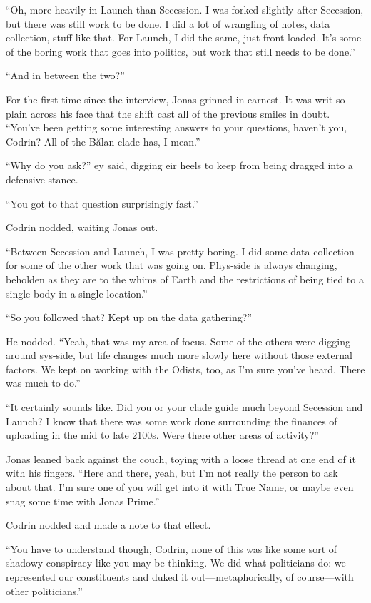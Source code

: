``Oh, more heavily in Launch than Secession. I was forked slightly after Secession, but there was still work to be done. I did a lot of wrangling of notes, data collection, stuff like that. For Launch, I did the same, just front-loaded. It's some of the boring work that goes into politics, but work that still needs to be done.''

``And in between the two?''

For the first time since the interview, Jonas grinned in earnest. It was writ so plain across his face that the shift cast all of the previous smiles in doubt. ``You've been getting some interesting answers to your questions, haven't you, Codrin? All of the Bălan clade has, I mean.''

``Why do you ask?'' ey said, digging eir heels to keep from being dragged into a defensive stance.

``You got to that question surprisingly fast.''

Codrin nodded, waiting Jonas out.

``Between Secession and Launch, I was pretty boring. I did some data collection for some of the other work that was going on. Phys-side is always changing, beholden as they are to the whims of Earth and the restrictions of being tied to a single body in a single location.''

``So you followed that? Kept up on the data gathering?''

He nodded. ``Yeah, that was my area of focus. Some of the others were digging around sys-side, but life changes much more slowly here without those external factors. We kept on working with the Odists, too, as I'm sure you've heard. There was much to do.''

``It certainly sounds like. Did you or your clade guide much beyond Secession and Launch? I know that there was some work done surrounding the finances of uploading in the mid to late 2100s. Were there other areas of activity?''

Jonas leaned back against the couch, toying with a loose thread at one end of it with his fingers. ``Here and there, yeah, but I'm not really the person to ask about that. I'm sure one of you will get into it with True Name, or maybe even snag some time with Jonas Prime.''

Codrin nodded and made a note to that effect.

``You have to understand though, Codrin, none of this was like some sort of shadowy conspiracy like you may be thinking. We did what politicians do: we represented our constituents and duked it out---metaphorically, of course---with other politicians.''

